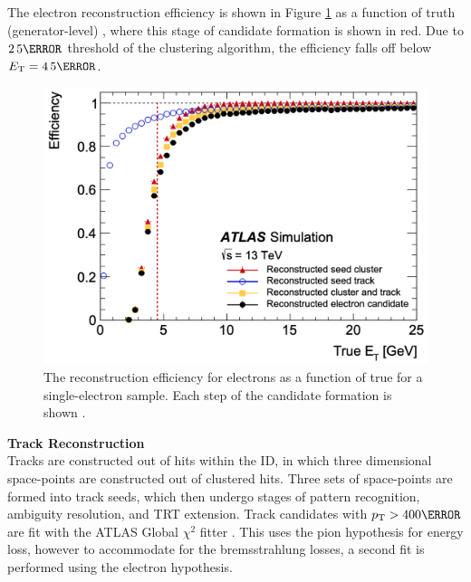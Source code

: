 The electron reconstruction efficiency is shown in Figure \ref{fig:electron-eff} as a function of truth (generator-level) \et, where this stage of candidate formation is shown in red. Due to $\unit{2.5}{\GeV}$ threshold of the clustering algorithm, the efficiency falls off below $\et = \unit{4.5}{\GeV}$.



\begin{figure}[!thp]
    \centering
    \includegraphics[width=.65\textwidth]{chapters/chapter3_eventreco/images/electron-efficiency.png}

    \caption[The reconstruction efficiency for electrons as a function of true \et.]{The reconstruction efficiency for electrons as a function of true \et for a single-electron sample. Each step of the candidate formation is shown \cite{electron-efficiency}.}
    \label{fig:electron-eff}
\end{figure}

\noindent\textbf{Track Reconstruction}\\ %
\indent Tracks are constructed out of hits within the \gls{ID}, in which three dimensional space-points are constructed out of clustered hits. Three sets of space-points are formed into track seeds, which then undergo stages of pattern recognition, ambiguity resolution, and \gls{TRT} extension. Track candidates with $\pt > \unit{400}{\MeV}$ are fit with the ATLAS Global $\chi^2$ fitter \cite{chi-2-fitter}. This uses the pion hypothesis for energy loss, however to accommodate for the bremsstrahlung losses, a second fit is performed using the electron hypothesis.

